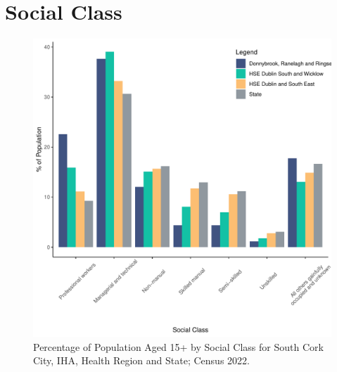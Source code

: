 \documentclass{article}
\begin{document}
\section{Social Class}\label{sect:SC}
\begin{figure}[H]
	\centering
	\includegraphics[width = 140mm]{../figures/SocialClassED.pdf}
	\caption{Percentage of Population Aged 15+ by Social Class for South Cork City, IHA, Health Region and State; Census 2022.}
	\label{fig:vbnv}
	\end{figure}
\end{document}
